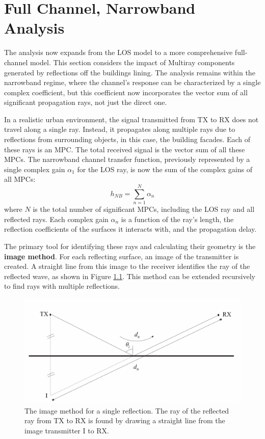 \chapter{Full Channel, Narrowband Analysis}
\label{chap:full_narrow}

The analysis now expands from the LOS model to a more comprehensive full-channel model. This section considers the impact of Multiray components generated by reflections off the buildings lining. The analysis remains within the narrowband regime, where the channel's response can be characterized by a single complex coefficient, but this coefficient now incorporates the vector sum of all significant propagation rays, not just the direct one.


In a realistic urban environment, the signal transmitted from TX to RX does not travel along a single ray. Instead, it propagates along multiple rays due to reflections from surrounding objects, in this case, the building facades. Each of these rays is an MPC. The total received signal is the vector sum of all these MPCs. The narrowband channel transfer function, previously represented by a single complex gain $\alpha_1$ for the LOS ray, is now the sum of the complex gains of all MPCs:
\begin{equation}
	h_{NB} = \sum_{n=1}^{N} \alpha_n
\end{equation}
where $N$ is the total number of significant MPCs, including the LOS ray and all reflected rays. Each complex gain $\alpha_n$ is a function of the ray's length, the reflection coefficients of the surfaces it interacts with, and the propagation delay.

The primary tool for identifying these rays and calculating their geometry is the \textbf{image method}. For each reflecting surface, an image of the transmitter is created. A straight line from this image to the receiver identifies the ray of the reflected wave, as shown in Figure \ref{fig:image_method_single}. This method can be extended recursively to find rays with multiple reflections.

\begin{figure}[h!]
	\centering
	\includegraphics[width=0.7\linewidth]{content/4-images/image-method.png}
	\caption{The image method for a single reflection. The ray of the reflected ray from TX to RX is found by drawing a straight line from the image transmitter I to RX.}
	\label{fig:image_method_single}
\end{figure}


